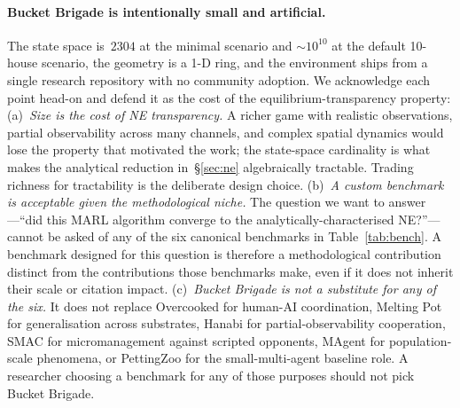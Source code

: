 \documentclass{anvil-paper}
\begin{document}
\paragraph{Bucket Brigade is intentionally small and artificial.}
The state space is~$2304$ at the minimal scenario and $\sim\!10^{10}$ at the
default 10-house scenario, the geometry is a 1-D ring, and the environment
ships from a single research repository with no community adoption. We
acknowledge each point head-on and defend it as the cost of the
equilibrium-transparency property:
(a)~\emph{Size is the cost of NE transparency.} A richer game with realistic
observations, partial observability across many channels, and complex spatial
dynamics would lose the property that motivated the work; the state-space
cardinality is what makes the analytical reduction in~\S\ref{sec:ne}
algebraically tractable. Trading richness for tractability is the deliberate
design choice.
(b)~\emph{A custom benchmark is acceptable given the methodological niche.}
The question we want to answer---``did this MARL algorithm converge to the
analytically-characterised NE?''---cannot be asked of any of the six
canonical benchmarks in Table~\ref{tab:bench}. A benchmark designed for this
question is therefore a methodological contribution distinct from the
contributions those benchmarks make, even if it does not inherit their scale
or citation impact.
(c)~\emph{Bucket Brigade is not a substitute for any of the six.} It does
not replace Overcooked for human-AI coordination, Melting Pot for
generalisation across substrates, Hanabi for partial-observability
cooperation, SMAC for micromanagement against scripted opponents, MAgent
for population-scale phenomena, or PettingZoo for the small-multi-agent
baseline role. A researcher choosing a benchmark for any of those purposes
should not pick Bucket Brigade.
\end{document}
